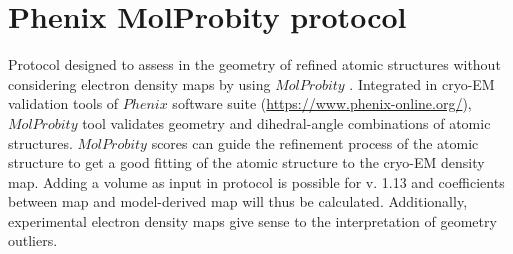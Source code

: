 \section{Phenix MolProbity protocol}
\label{app:molprobityProtocol}%
Protocol designed to assess in \scipion the geometry of refined atomic structures without considering electron density maps by using $MolProbity$ \citep{davis2004}. Integrated in cryo-EM validation tools of $Phenix$ software suite (\url{https://www.phenix-online.org/}), $MolProbity$ tool validates geometry and dihedral-angle combinations of atomic structures. $MolProbity$ scores can guide the refinement process of the atomic structure to get a good fitting of the atomic structure to the cryo-EM density map. Adding a volume as input in  protocol is possible for \phenix v. 1.13 and coefficients between map and model-derived map will thus be calculated. Additionally, experimental electron density maps give sense to the interpretation of geometry outliers.

